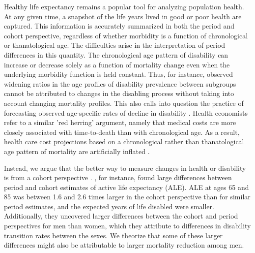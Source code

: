 \documentclass[11pt,oneside,a4paper]{article} %
\begin{document}
Healthy life expectancy remains a popular tool for analyzing population health. At any given time, a snapshot of the life years lived in good or poor health are captured. This information is accurately summarized in both the period and cohort perspective, regardless of whether morbidity is a function of chronological or thanatological age. The difficulties arise in the interpretation of period differences in this quantity. The chronological age pattern of disability can increase or decrease solely as a function of mortality change even when the underlying morbidity function is held constant. Thus, for instance, observed widening ratios in the age profiles of disability prevalence between subgroups \citep{Crimmins2001} cannot be attributed to changes in the disabling process without taking into account changing mortality profiles. This also calls into question the practice of forecasting observed age-specific rates of decline in disability \citep{Manton2006,Khaw1999}. Health economists refer to a similar 'red herring' argument, namely that medical costs are more closely associated with time-to-death than with chronological age. As a result, health care cost projections based on a chronological rather than thanatological age pattern of mortality are artificially inflated \citep{Zweifel1999,Geue2014}.

Instead, we argue that the better way to measure changes in health or disability is from a cohort perspective \citep{Manton2000,Manton2008,Christensen2013}. \citet{Manton2000}, for instance, found large differences between period and cohort estimates of active life expectancy (ALE). ALE at ages 65 and 85 was between 1.6 and 2.6 times larger in the cohort perspective than for similar period estimates, and the expected years of life disabled were smaller. Additionally, they uncovered larger differences between the cohort and period perspectives for men than women, which they attribute to differences in disability transition rates between the sexes. We theorize that some of these larger differences might also be attributable to larger mortality reduction among men.
\end{document}
